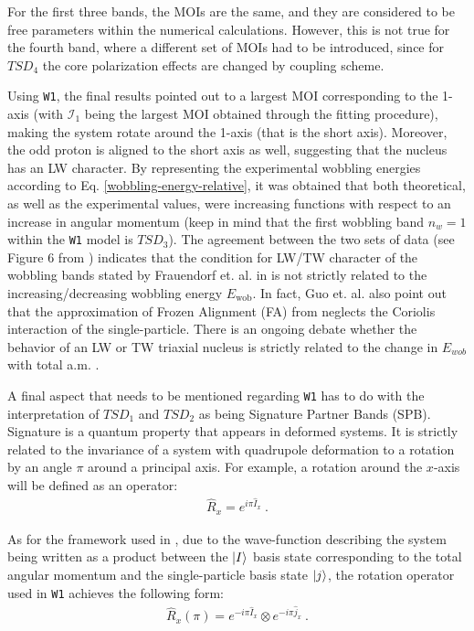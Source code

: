 \documentclass[11pt]{article}
\begin{document}
For the first three bands, the MOIs are the same, and they are considered to be free parameters within the numerical calculations. However, this is not true for the fourth band, where a different set of MOIs had to be introduced, since for $TSD_4$ the core polarization effects are changed by coupling scheme.

Using \texttt{W1}, the final results pointed out to a largest MOI corresponding to the 1-axis (with $\mathcal{I}_1$ being the largest MOI obtained through the fitting procedure), making the system rotate around the 1-axis (that is the short axis). Moreover, the odd proton is aligned to the short axis as well, suggesting that the nucleus has an LW character. By representing the experimental wobbling energies according to Eq. \ref{wobbling-energy-relative}, it was obtained that both theoretical, as well as the experimental values, were increasing functions with respect to an increase in angular momentum (keep in mind that the first wobbling band $n_w=1$ within the \texttt{W1} model is $TSD_3$). The agreement between the two sets of data (see Figure 6 from \cite{raduta2020approach}) indicates that the condition for LW/TW character of the wobbling bands stated by Frauendorf et. al. in \cite{frauendorf2014transverse} is not strictly related to the increasing/decreasing wobbling energy $E_\text{wob}$. In fact, Guo et. al. \cite{guo2020risk} also point out that the approximation of Frozen Alignment (FA) from \cite{frauendorf2014transverse} neglects the Coriolis interaction of the single-particle. There is an ongoing debate whether the behavior of an LW or TW triaxial nucleus is strictly related to the change in $E_{wob}$ with total a.m. \cite{tanabe2017stability,frauendorf2018comment,tanabe2018reply}.


A final aspect that needs to be mentioned regarding \texttt{W1} has to do with the interpretation of $TSD_1$ and $TSD_2$ as being Signature Partner Bands (SPB). Signature \cite{bohr1998nuclear} is a quantum property that appears in deformed systems. It is strictly related to the invariance of a system with quadrupole deformation to a rotation by an angle $\pi$ around a principal axis. For example, a rotation around the $x$-axis will be defined as an operator:
\begin{align}
    \hat{R}_x=e^{i\pi\hat{I}_x}\ .
\end{align}

As for the framework used in \cite{raduta2020approach,raduta2020towards}, due to the wave-function describing the system being written as a product between the $\ket{I}$ basis state corresponding to the total angular momentum and the single-particle basis state $\ket{j}$, the rotation operator used in \texttt{W1} achieves the following form:
\begin{align}
    \hat{R}_x(\pi)=e^{-i\pi\hat{I}_x}\otimes e^{-i\pi\hat{j}_x}\ .
\end{align}
\end{document}
